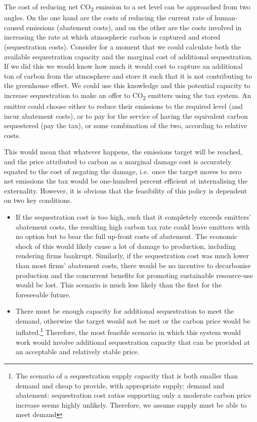 \documentclass[]{tufte-handout}
\begin{document}
The cost of reducing net CO\textsubscript{2} emission to a set level can
be approached from two angles. On the one hand are the costs of reducing
the current rate of human-caused emissions (abatement costs), and on the
other are the costs involved in increasing the rate at which atmospheric
carbon is captured and stored (sequestration costs). Consider for a
moment that we could calculate both the available sequestration capacity
and the marginal cost of additional sequestration. If we did this we
would know how much it would cost to capture an additional ton of carbon
from the atmosphere and store it such that it is not contributing to the
greenhouse effect. We could use this knowledge and this potential
capacity to increase sequestration to make an offer to
CO\textsubscript{2} emitters using the tax system. An emitter could
choose either to reduce their emissions to the required level (and incur
abatement costs), or to pay for the service of having the equivalent
carbon sequestered (pay the tax), or some combination of the two,
according to relative costs.

This would mean that whatever happens, the emissions target will be
reached, and the price attributed to carbon as a marginal damage cost is
accurately equated to the cost of negating the damage, i.e.~once the
target moves to zero net emissions the tax would be one-hundred percent
efficient at internalising the externality. However, it is obvious that
the feasibility of this policy is dependent on two key conditions.

\begin{itemize}
\item
  If the sequestration cost is too high, such that it completely exceeds
  emitters' abatement costs, the resulting high carbon tax rate could
  leave emitters with no option but to bear the full up-front costs of
  abatement. The economic shock of this would likely cause a lot of
  damage to production, including rendering firms bankrupt. Similarly,
  if the sequestration cost was much lower than most firms' abatement
  costs, there would be no incentive to decarbonise production and the
  concurrent benefits for promoting sustainable resource-use would be
  lost. This scenario is much less likely than the first for the
  foreseeable future.
\item
  There must be enough capacity for additional sequestration to meet the
  demand, otherwise the target would not be met or the carbon price
  would be inflated.\footnote{The scenario of a sequestration supply
    capacity that is both smaller than demand and cheap to provide, with
    appropriate supply: demand and abatement: sequestration cost ratios
    supporting only a moderate carbon price increase seems highly
    unlikely. Therefore, we assume supply must be able to meet demand}
  Therefore, the most feasible scenario in which this system would work
  would involve additional sequestration capacity that can be provided
  at an acceptable and relatively stable price.
\end{itemize}
\end{document}
